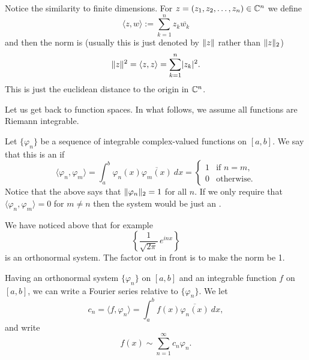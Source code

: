 \begin{remark}
Notice the similarity to finite dimensions.  For $z = (z_1,z_2,\ldots,z_n) \in 
{\mathbb{C}}^n$ we define 
\begin{equation*}
\langle z , w \rangle :=
\sum_{k=1}^n z_k \overline{w_k}
\end{equation*}
and then the norm is (usually this is just denoted by $\lVert {z} \rVert$ rather than
$\lVert {z} \rVert_2$)
\begin{equation*}
\lVert {z} \rVert^2 = 
\langle z , z \rangle =
\sum_{k=1}^n \lvert {z_k} \rvert^2 .
\end{equation*}
This is just the euclidean distance to the origin in ${\mathbb{C}}^n$.
\end{remark}

Let us get back to function spaces.  In what follows, we assume all functions are
Riemann integrable.

\begin{defn}
Let $\{ \varphi_n \}$ be a sequence of integrable complex-valued
functions on $[a,b]$.  We say that this is an
\emph{} if
\begin{equation*}
\langle \varphi_n , \varphi_m \rangle
=
\int_a^b \varphi_n(x) \overline{\varphi_m(x)} ~ dx
= 
\begin{cases}
1 & \text{if $n=m$,} \\
0 & \text{otherwise.}
\end{cases}
\end{equation*}
Notice that the above says that $\lVert {\varphi_n} \rVert_2 = 1$ for all $n$.  If we
only require that 
$\langle \varphi_n , \varphi_m \rangle = 0$ for $m\not= n$ then
the system would be just an \emph{}.
\end{defn}

We have noticed above that for example
\begin{equation*}
\left\{ \frac{1}{\sqrt{2\pi}} \, e^{inx} \right\}
\end{equation*}
is an orthonormal system.  The factor out in front is to make the norm be 1.

Having an orthonormal system $\{ \varphi_n \}$ on $[a,b]$ and an integrable function $f$
on $[a,b]$, we can write
a Fourier series relative to $\{ \varphi_n \}$.  We let
\begin{equation*}
c_n =
\langle f , \varphi_n \rangle
=
\int_a^b f(x) \overline{\varphi_n(x)} ~ dx ,
\end{equation*}
and write
\begin{equation*}
f(x) \sim \sum_{n=1}^\infty c_n \varphi_n .
\end{equation*}


